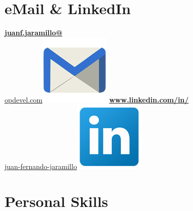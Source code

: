 \begin{aside}
    \section{eMail \& LinkedIn}
    \href{mailto:juanf.jaramillo@opdevel.com}{\small{\textbf{juanf.jaramillo@}\\opdevel.com}\includegraphics[scale=0.07]{img/email2.png}}
    \href{https://www.linkedin.com/in/juan-fernando-jaramillo/}{\textbf{www.linkedin.com/in/}\small{\\juan-fernando-jaramillo}\includegraphics[scale=0.07]{img/Linkedin.png}}
   ~
   ~
   ~
   ~
   ~
   ~
   ~
   ~
   ~
   ~
  \section{Personal Skills}
\end{aside}
